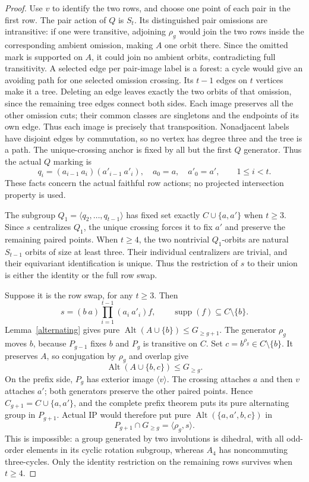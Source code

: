 \documentclass[11pt,a4paper]{article}
\newcommand{\gen}[1]{\langle#1\rangle}
\begin{document}
\begin{proof}
Use $v$ to identify the two rows, and choose one point of
each pair in the first row. The pair action of $Q$ is $S_t$.
Its distinguished pair omissions are intransitive: if one
were transitive, adjoining $\rho_g$ would join the two rows
inside the corresponding ambient omission, making $A$ one
orbit there. Since the omitted mark is supported on $A$,
it could join no ambient orbits, contradicting full transitivity.
A selected edge per pair-image label is a forest: a cycle
would give an avoiding path for one selected omission crossing.
Its $t-1$ edges on $t$ vertices make it a tree. Deleting an
edge leaves exactly the two orbits of that omission, since the
remaining tree edges connect both sides. Each image preserves
all the other omission cuts; their common classes are singletons
and the endpoints of its own edge. Thus each image is precisely
that transposition. Nonadjacent labels have disjoint edges by
commutation, so no vertex has degree three and the tree is a path. The unique-crossing anchor is fixed by all
but the first $Q$ generator. Thus the actual $Q$ marking is
\[
 q_i=(a_{i-1}\ a_i)(a'_{i-1}\ a'_i),\quad
 a_0=a,\quad a'_0=a',\qquad1\le i<t.
\]
These facts concern the actual faithful row actions; no projected
intersection property is used.

The subgroup $Q_1=\gen{q_2,\ldots,q_{t-1}}$ has fixed set
exactly $C\cup\{a,a'\}$ when $t\ge3$. Since $s$ centralizes
$Q_1$, the unique crossing forces it to fix $a'$ and preserve
the remaining paired points. When $t\ge4$, the two nontrivial
$Q_1$-orbits are natural $S_{t-1}$ orbits of size at least three.
Their individual centralizers are trivial, and their equivariant
identification is unique. Thus the restriction of $s$ to their
union is either the identity or the full row swap.

Suppose it is the row swap, for any $t\ge3$. Then
\[
 s=(b\ a)\prod_{i=1}^{t-1}(a_i\ a'_i)f,
 \qquad \operatorname{supp}(f)\subseteq C\setminus\{b\}.
\]
Lemma~\ref{alternating} gives pure
$\operatorname{Alt}(A\cup\{b\})\le G_{\ge g+1}$.
The generator $\rho_g$ moves $b$, because $P_{g-1}$ fixes $b$
and $P_g$ is transitive on $C$. Set $c=b^{\rho_g}\in C\setminus\{b\}$.
It preserves $A$, so conjugation by $\rho_g$ and overlap give
\[
             \operatorname{Alt}(A\cup\{b,c\})\le G_{\ge g}.
\]
On the prefix side, $P_g$ has exterior image $\gen v$.
The crossing attaches $a$ and then $v$ attaches $a'$; both
generators preserve the other paired points. Hence
$C_{g+1}=C\cup\{a,a'\}$, and the complete prefix theorem
puts its pure alternating group in $P_{g+1}$.
Actual IP would therefore put pure
$\operatorname{Alt}(\{a,a',b,c\})$ in
\[
 P_{g+1}\cap G_{\ge g}=\gen{\rho_g,s}.
\]
This is impossible: a group generated by two involutions is
dihedral, with all odd-order elements in its cyclic rotation
subgroup, whereas $A_4$ has noncommuting three-cycles.
Only the identity restriction on the remaining rows survives
when $t\ge4$.
\end{proof}
\end{document}
